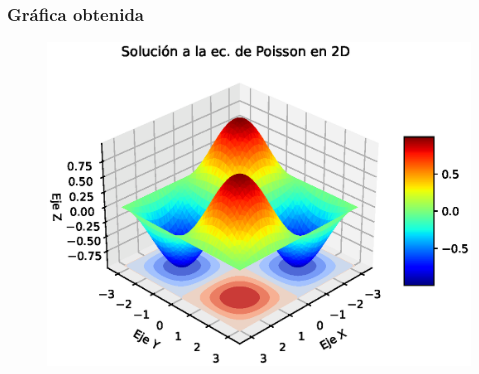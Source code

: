\documentclass[12pt]{beamer}
\begin{document}
{
\begin{frame}
\frametitle{Gráfica obtenida}
\begin{figure}[h!]
   \centering
   \includegraphics[scale=0.55]{Imagenes/plot_Ejercicio_Ec_PoissonXY_02.eps}
\end{figure}
\end{frame}
}
\end{document}
